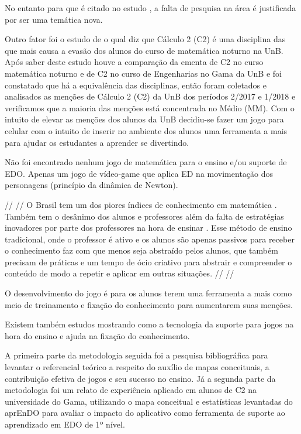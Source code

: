  No entanto para \cite{dicheva} que é citado no estudo \cite{revbibmatgam}, a falta de pesquisa na área é justificada por ser uma temática nova.

Outro fator foi o estudo de \cite{evasaoC2} o qual diz que Cálculo 2 (C2) é uma disciplina das que mais causa a evasão dos alunos do curso de matemática noturno na UnB. Após saber deste estudo houve a comparação da ementa de C2 no curso matemática noturno e de C2 no curso de Engenharias no Gama da UnB e foi constatado que há a equivalência das disciplinas, então foram coletados e analisados as menções de Cálculo 2 (C2) da UnB dos períodos 2/2017 e 1/2018 e verificamos que a maioria das menções está concentrada no Médio (MM). Com o intuito de elevar as menções dos alunos da UnB decidiu-se fazer um jogo para celular com o intuito de inserir no ambiente dos alunos uma ferramenta a mais para ajudar os estudantes a aprender se divertindo. 

Não foi encontrado nenhum jogo de matemática para o ensino e/ou suporte de EDO. Apenas um jogo de vídeo-game que aplica ED na movimentação dos personagens (princípio da dinâmica de Newton)\cite{videoGameED}.

// //
O Brasil tem um dos piores índices de conhecimento em matemática \cite{indiceRuimMat}. Também tem o desânimo dos alunos e professores além da falta de estratégias inovadores por parte dos professores na hora de ensinar \cite{softwaregamificado}. Esse método de ensino tradicional, onde o professor é ativo e os alunos são apenas passivos para receber o conhecimento faz com que menos seja abstraído pelos alunos, que também precisam de práticas e um tempo de ócio criativo para abstrair e compreender o conteúdo de modo a repetir e aplicar em outras situações.
// //

O desenvolvimento do jogo é para os alunos terem uma ferramenta a mais como meio de treinamento e fixação do conhecimento para aumentarem suas menções.

Existem também estudos mostrando como a tecnologia da suporte para jogos na hora do ensino e ajuda na fixação do conhecimento. 

A primeira parte da metodologia seguida foi a pesquisa bibliográfica para levantar o referencial teórico a respeito do auxílio de mapas conceituais, a contribuição efetiva de jogos e seu sucesso no ensino. Já a segunda parte da metodologia foi um relato de experiência aplicado em alunos de C2 na universidade do Gama, utilizando o mapa conceitual e estatísticas levantadas do aprEnDO para avaliar o impacto do aplicativo como ferramenta de suporte ao aprendizado em EDO de 1º nível.


